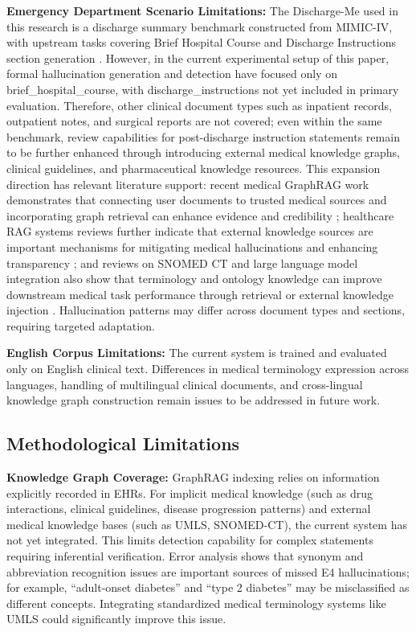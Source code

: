 \documentclass[11pt]{article}
\begin{document}
\textbf{Emergency Department Scenario Limitations:} The Discharge-Me used in this research is a discharge summary benchmark constructed from MIMIC-IV, with upstream tasks covering Brief Hospital Course and Discharge Instructions section generation \citep{stanfordaimi2024dischargeMe,xu2024dischargeMeSharedTask}. However, in the current experimental setup of this paper, formal hallucination generation and detection have focused only on brief\_hospital\_course, with discharge\_instructions not yet included in primary evaluation. Therefore, other clinical document types such as inpatient records, outpatient notes, and surgical reports are not covered; even within the same benchmark, review capabilities for post-discharge instruction statements remain to be further enhanced through introducing external medical knowledge graphs, clinical guidelines, and pharmaceutical knowledge resources. This expansion direction has relevant literature support: recent medical GraphRAG work demonstrates that connecting user documents to trusted medical sources and incorporating graph retrieval can enhance evidence and credibility \citep{wu2025medicalGraphRAG}; healthcare RAG systems reviews further indicate that external knowledge sources are important mechanisms for mitigating medical hallucinations and enhancing transparency \citep{amugongo2025healthcareRAGReview}; and reviews on SNOMED CT and large language model integration also show that terminology and ontology knowledge can improve downstream medical task performance through retrieval or external knowledge injection \citep{chang2024snomedCtLLM}. Hallucination patterns may differ across document types and sections, requiring targeted adaptation.

\textbf{English Corpus Limitations:} The current system is trained and evaluated only on English clinical text. Differences in medical terminology expression across languages, handling of multilingual clinical documents, and cross-lingual knowledge graph construction remain issues to be addressed in future work.

\subsection{Methodological Limitations}

\textbf{Knowledge Graph Coverage:} GraphRAG indexing relies on information explicitly recorded in EHRs. For implicit medical knowledge (such as drug interactions, clinical guidelines, disease progression patterns) and external medical knowledge bases (such as UMLS, SNOMED-CT), the current system has not yet integrated. This limits detection capability for complex statements requiring inferential verification. Error analysis shows that synonym and abbreviation recognition issues are important sources of missed E4 hallucinations; for example, ``adult-onset diabetes'' and ``type 2 diabetes'' may be misclassified as different concepts. Integrating standardized medical terminology systems like UMLS could significantly improve this issue.
\end{document}
